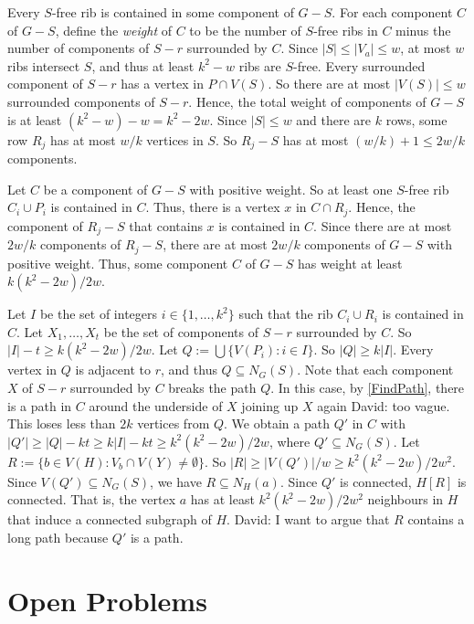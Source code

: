 \documentclass{patmorin}
\renewcommand{\geq}{\geqslant}
\renewcommand{\leq}{\leqslant}
\newcommand{\david}[1]{{\color{orange} David: #1}}
\newcommand{\defin}[1]{\emph{\textcolor{brightmaroon}{#1}}}
\begin{document}
Every $S$-free rib is contained in some component of $G-S$.
For each component $C$ of $G-S$, define the \defin{weight} of $C$ to be the number of $S$-free ribs in $C$ minus the number of components of $S-r$ surrounded by $C$. Since $|S|\leq |V_a|\leq w$, at most $w$ ribs intersect $S$, and thus at least $k^2-w$ ribs are $S$-free. Every surrounded component of $S-r$ has a vertex in $P\cap V(S)$. So there are at most $|V(S)|\leq w$ surrounded components of $S-r$. Hence, the total weight of components of $G-S$ is at least $(k^2-w)-w=k^2-2w$. Since $|S|\leq w$ and there are $k$ rows, some row $R_j$ has at most $w/k$ vertices in $S$. So $R_j-S$ has at most $(w/k)+1\leq 2w/k$ components.

Let $C$ be a component of $G-S$ with positive weight. So at least one $S$-free rib $C_i\cup P_i$ is contained in $C$. Thus, there is a vertex $x$ in $C\cap R_j$. Hence, the component of $R_j-S$ that contains $x$ is contained in $C$. Since there are at most $2w/k$ components of $R_j-S$, there are at most $2w/k$ components of $G-S$ with positive weight. Thus, some component $C$ of $G-S$ has weight at least $k(k^2-2w)/2w$.

Let $I$ be the set of integers $i\in\{1,\dots,k^2\}$ such that the rib $C_i\cup R_i$ is contained in $C$. Let $X_1,\dots,X_t$ be the set of components of $S-r$ surrounded by $C$. So $|I|-t\geq k(k^2-2w)/2w$. Let $Q:=\bigcup\{V(P_i):i\in I\}$. So $|Q|\geq k|I|$. Every vertex in $Q$ is adjacent to $r$, and thus $Q\subseteq N_G(S)$. Note that each component $X$ of $S-r$ surrounded by $C$ breaks the path $Q$. In this case, by \cref{FindPath}, there is a path in $C$ around the underside of $X$ joining up $X$ again \david{too vague}. This loses less than $2k$ vertices from $Q$. We obtain a path $Q'$ in $C$ with $|Q'|\geq |Q|-kt \geq k|I|-kt \geq k^2(k^2-2w)/2w$, where $Q'\subseteq N_G(S)$.
Let $R:=\{ b\in V(H): V_b\cap V(Y)\neq\emptyset\}$. So $|R|\geq |V(Q')|/w\geq k^2(k^2-2w)/2w^2$. Since $V(Q')\subseteq N_G(S)$, we have $R\subseteq N_H(a)$. Since $Q'$ is connected, $H[R]$ is connected. That is, the vertex $a$ has at least $k^2(k^2-2w)/2w^2$ neighbours in $H$ that induce a connected subgraph of $H$. \david{I want to argue that $R$ contains a long path because $Q'$ is a path. }


\section{Open Problems}
\end{document}

